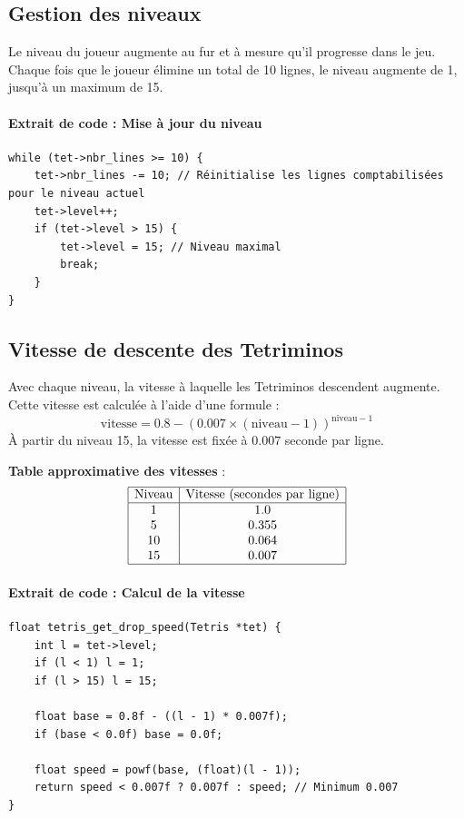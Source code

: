 \documentclass[12pt,a4paper]{report}
\begin{document}
\subsection{Gestion des niveaux}
Le niveau du joueur augmente au fur et à mesure qu’il progresse dans le jeu. Chaque fois que le joueur élimine un total de 10 lignes, le niveau augmente de 1, jusqu’à un maximum de 15.

\paragraph{Extrait de code : Mise à jour du niveau}
\begin{lstlisting}
while (tet->nbr_lines >= 10) {
    tet->nbr_lines -= 10; // Réinitialise les lignes comptabilisées pour le niveau actuel
    tet->level++;
    if (tet->level > 15) {
        tet->level = 15; // Niveau maximal
        break;
    }
}
\end{lstlisting}

\subsection{Vitesse de descente des Tetriminos}
Avec chaque niveau, la vitesse à laquelle les Tetriminos descendent augmente. Cette vitesse est calculée à l’aide d’une formule :
\[
\text{vitesse} = 0.8 - (0.007 \times (\text{niveau} - 1))^{\text{niveau} - 1}
\]
À partir du niveau 15, la vitesse est fixée à \(0.007\) seconde par ligne.

\textbf{Table approximative des vitesses} :
\[
\begin{array}{|c|c|}
\hline
\text{Niveau} & \text{Vitesse (secondes par ligne)} \\
\hline
1 & 1.0 \\
5 & 0.355 \\
10 & 0.064 \\
15 & 0.007 \\
\hline
\end{array}
\]

\paragraph{Extrait de code : Calcul de la vitesse}
\begin{lstlisting}
float tetris_get_drop_speed(Tetris *tet) {
    int l = tet->level;
    if (l < 1) l = 1;
    if (l > 15) l = 15;

    float base = 0.8f - ((l - 1) * 0.007f);
    if (base < 0.0f) base = 0.0f;

    float speed = powf(base, (float)(l - 1));
    return speed < 0.007f ? 0.007f : speed; // Minimum 0.007
}
\end{lstlisting}
\newpage
\end{document}
